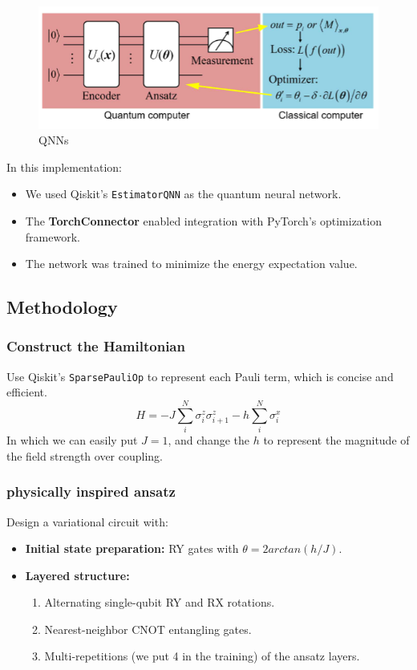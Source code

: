 \documentclass[pre,twocolumn,floatfix]{revtex4-1}
\begin{document}
\begin{figure}[H]
    \centering
    \includegraphics[width=0.5\linewidth]{images/QNN.png}
    \caption{QNNs}
    \label{3}
\end{figure}

In this implementation:
\begin{itemize}
    \item We used Qiskit's \verb|EstimatorQNN| as the quantum neural network.
    \item The \textbf{TorchConnector} enabled integration with PyTorch's optimization framework.
    \item The network was trained to minimize the energy expectation value.
\end{itemize}

\subsection{Methodology}
\subsubsection{Construct the Hamiltonian}
Use Qiskit's \verb|SparsePauliOp| to represent each Pauli term, which is concise and efficient.
    \begin{equation}
         H=-J\sum_i^N\sigma_i^{z}\sigma_{i+1}^{z}-h\sum_i^N\sigma_i^x
    \end{equation}
In which we can easily put $J=1$, and change the $h$ to represent the magnitude of the field strength over coupling.

\subsubsection{physically inspired ansatz}
Design a variational circuit with:
\begin{itemize}
    \item \textbf{Initial state preparation:} RY gates with $\theta = 2arctan(h/J)$.
    \item \textbf{Layered structure:}
    \begin{enumerate}
        \item Alternating single-qubit RY and RX rotations.
        \item Nearest-neighbor CNOT entangling gates.
        \item Multi-repetitions (we put 4 in the training) of the ansatz layers.
    \end{enumerate}
\end{itemize}
\end{document}
